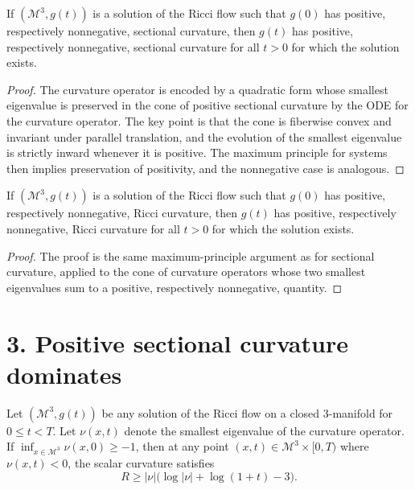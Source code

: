 \begin{lemma}
\label{ch09-lem-positive-sectional-curvature-preserved}
If \((\mathcal M^3,g(t))\) is a solution of the Ricci flow such that \(g(0)\) has positive, respectively nonnegative, sectional curvature, then \(g(t)\) has positive, respectively nonnegative, sectional curvature for all \(t>0\) for which the solution exists.
\end{lemma}

\begin{proof}
The curvature operator is encoded by a quadratic form whose smallest eigenvalue is preserved in the cone of positive sectional curvature by the ODE for the curvature operator. The key point is that the cone is fiberwise convex and invariant under parallel translation, and the evolution of the smallest eigenvalue is strictly inward whenever it is positive. The maximum principle for systems then implies preservation of positivity, and the nonnegative case is analogous.
\end{proof}

\begin{lemma}
\label{ch09-lem-positive-ricci-curvature-preserved}
If \((\mathcal M^3,g(t))\) is a solution of the Ricci flow such that \(g(0)\) has positive, respectively nonnegative, Ricci curvature, then \(g(t)\) has positive, respectively nonnegative, Ricci curvature for all \(t>0\) for which the solution exists.
\end{lemma}

\begin{proof}
The proof is the same maximum-principle argument as for sectional curvature, applied to the cone of curvature operators whose two smallest eigenvalues sum to a positive, respectively nonnegative, quantity.
\end{proof}

\section*{3. Positive sectional curvature dominates}

\begin{theorem}
\label{ch09-thm-pinching-estimate}
Let \((\mathcal M^3,g(t))\) be any solution of the Ricci flow on a closed \(3\)-manifold for \(0\le t<T\). Let \(\nu(x,t)\) denote the smallest eigenvalue of the curvature operator. If \(\inf_{x\in\mathcal M^3}\nu(x,0)\ge -1\), then at any point \((x,t)\in\mathcal M^3\times[0,T)\) where \(\nu(x,t)<0\), the scalar curvature satisfies
\[
R\ge |\nu|\bigl(\log |\nu|+\log(1+t)-3\bigr).
\]
\end{theorem}

